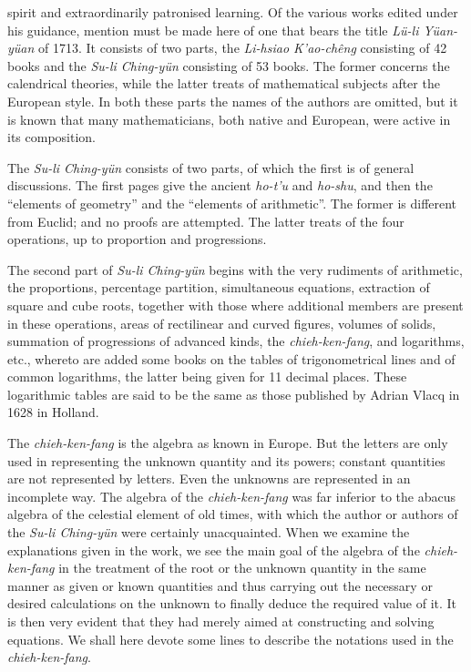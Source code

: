 \documentclass[11pt]{article}
\newcommand{\scanpage}[2]{\clearpage\setcounter{footnote}{0}\noindent{\footnotesize\color{gray}PDF page #1 · #2}\par\medskip}
\newcommand{\scanfooter}{}
\begin{document}
\scanpage{0131}{Chapter 17, printed page 117}
spirit and extraordinarily patronised learning. Of the various works edited under his guidance, mention must be made here of one that bears the title \emph{Lü-li Yüan-yüan} of 1713. It consists of two parts, the \emph{Li-hsiao K'ao-chêng} consisting of 42 books and the \emph{Su-li Ching-yün} consisting of 53 books. The former concerns the calendrical theories, while the latter treats of mathematical subjects after the European style. In both these parts the names of the authors are omitted, but it is known that many mathematicians, both native and European, were active in its composition.

The \emph{Su-li Ching-yün} consists of two parts, of which the first is of general discussions. The first pages give the ancient \emph{ho-t'u} and \emph{ho-shu}, and then the ``elements of geometry'' and the ``elements of arithmetic''. The former is different from Euclid; and no proofs are attempted. The latter treats of the four operations, up to proportion and progressions.

The second part of \emph{Su-li Ching-yün} begins with the very rudiments of arithmetic, the proportions, percentage partition, simultaneous equations, extraction of square and cube roots, together with those where additional members are present in these operations, areas of rectilinear and curved figures, volumes of solids, summation of progressions of advanced kinds, the \emph{chieh-ken-fang}, and logarithms, etc., whereto are added some books on the tables of trigonometrical lines and of common logarithms, the latter being given for 11 decimal places. These logarithmic tables are said to be the same as those published by Adrian Vlacq in 1628 in Holland.

The \emph{chieh-ken-fang} is the algebra as known in Europe. But the letters are only used in representing the unknown quantity and its powers; constant quantities are not represented by letters. Even the unknowns are represented in an incomplete way. The algebra of the \emph{chieh-ken-fang} was far inferior to the abacus algebra of the celestial element of old times, with which the author or authors of the \emph{Su-li Ching-yün} were certainly unacquainted. When we examine the explanations given in the work, we see the main goal of the algebra of the \emph{chieh-ken-fang} in the treatment of the root or the unknown quantity in the same manner as given or known quantities and thus carrying out the necessary or desired calculations on the unknown to finally deduce the required value of it. It is then very evident that they had merely aimed at constructing and solving equations. We shall here devote some lines to describe the notations used in the \emph{chieh-ken-fang}.
\scanfooter
\end{document}
